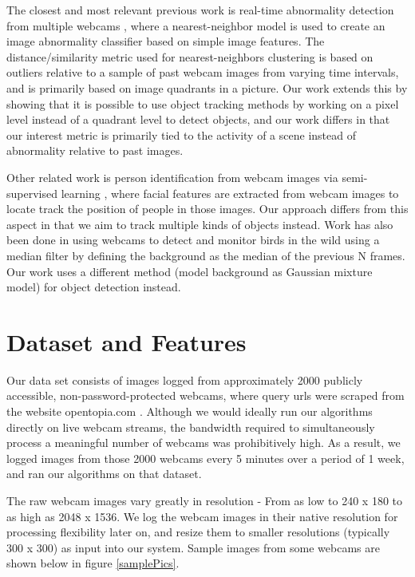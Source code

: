 \documentclass[10pt]{article} %
\begin{document}
The closest and most relevant previous work is real-time abnormality detection from multiple webcams \cite{huntingnessie}, where a nearest-neighbor model is used to create an image abnormality classifier based on simple image features. The distance/similarity metric used for nearest-neighbors clustering is based on outliers relative to a sample of past webcam images from varying time intervals, and is primarily based on image quadrants in a picture. Our work extends this by showing that it is possible to use object tracking methods by working on a pixel level instead of a quadrant level to detect objects, and our work differs in that our interest metric is primarily tied to the activity of a scene instead of abnormality relative to past images. 

Other related work is person identification from webcam images via semi-supervised learning \cite{personidentification}, where facial features are extracted from webcam images to locate track the position of people in those images. Our approach differs from this aspect in that we aim to track multiple kinds of objects instead. Work has also been done in using webcams to detect and monitor birds in the wild \cite{birddetection} using a median filter by defining the background as the median of the previous N frames. Our work uses a different method (model background as Gaussian mixture model) for object detection instead. 

\section{Dataset and Features}
Our data set consists of images logged from approximately 2000 publicly accessible, non-password-protected webcams, where query urls were scraped from the website opentopia.com \cite{opentopia}. Although we would ideally run our algorithms directly on live webcam streams, the bandwidth required to simultaneously process a meaningful number of webcams was prohibitively high. As a result, we logged images from those 2000 webcams every 5 minutes over a period of 1 week, and ran our algorithms on that dataset. 

The raw webcam images vary greatly in resolution - From as low to 240 x 180 to as high as 2048 x 1536. We log the webcam images in their native resolution for processing flexibility later on, and resize them to smaller resolutions (typically 300 x 300) as input into our system. Sample images from some webcams are shown below in figure \ref{samplePics}.
\end{document}
